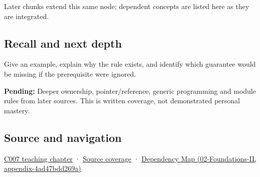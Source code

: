 Later chunks extend this same node; dependent concepts are listed here as they are integrated.

\subsection{Recall and next depth}\label{recall-and-next-depth}

Give an example, explain why the rule exists, and identify which guarantee would be missing if the prerequisite were ignored.

\textbf{Pending:} Deeper ownership, pointer/reference, generic programming and module rules from later sources. This is written coverage, not demonstrated personal mastery.

\subsection{Source and navigation}\label{source-and-navigation}

\href{Continuous\%20Notes/Computing\%20Foundations\%20-\%20From\%20Bits\%20to\%20C++\%20and\%20Systems\%20APIs\#Giving\%20a\%20program\%20a\%20buildable\%20shape}{C007 teaching chapter} · \hyperref[appendix-fd090d982a15]{Source coverage} · \href{}{Dependency Map (02-Foundations-II, appendix-4ad47bdd269a)}
